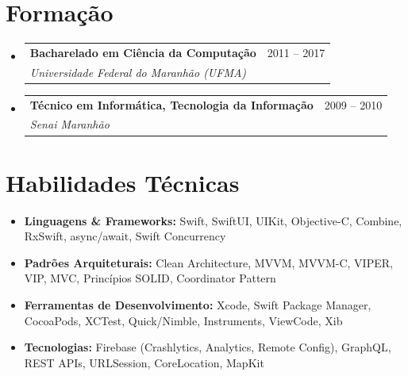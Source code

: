 \documentclass[11pt,letterpaper]{article}
\makeatletter
\newcommand{\resumeSubheading}[4]{
  \item
    \begin{tabular*}{\textwidth}{l@{\extracolsep{\fill}}r}
      \textbf{#1} & #2 \\
      \textit{#3} & \textit{#4} \\
    \end{tabular*}
}
\makeatother
\begin{document}
\section*{Formação}

\begin{itemize}[leftmargin=0.15in]
    \resumeSubheading
        {Bacharelado em Ciência da Computação}{2011 -- 2017}
        {Universidade Federal do Maranhão (UFMA)}{}
        
    \resumeSubheading
        {Técnico em Informática, Tecnologia da Informação}{2009 -- 2010}
        {Senai Maranhão}{}
\end{itemize}

\section*{Habilidades Técnicas}

\begin{itemize}[leftmargin=0.15in]
    \item \textbf{Linguagens \& Frameworks:} Swift, SwiftUI, UIKit, Objective-C, Combine, RxSwift, async/await, Swift Concurrency
    \item \textbf{Padrões Arquiteturais:} Clean Architecture, MVVM, MVVM-C, VIPER, VIP, MVC, Princípios SOLID, Coordinator Pattern
    \item \textbf{Ferramentas de Desenvolvimento:} Xcode, Swift Package Manager, CocoaPods, XCTest, Quick/Nimble, Instruments, ViewCode, Xib
    \item \textbf{Tecnologias:} Firebase (Crashlytics, Analytics, Remote Config), GraphQL, REST APIs, URLSession, CoreLocation, MapKit
\end{itemize}
\end{document}
